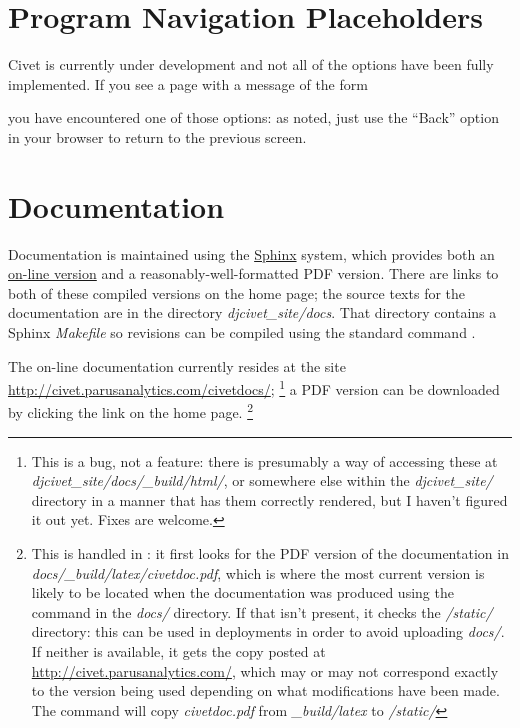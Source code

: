 \documentclass[letterpaper,10pt,english]{sphinxmanual}
\begin{document}
\section{Program Navigation Placeholders}
\label{intro:program-navigation-placeholders}
Civet is currently under development and not all of the options have
been fully implemented. If you see a page with a message of the form
\begin{quote}

\end{quote}

you have encountered one of those options: as noted, just use the “Back”
option in your browser to return to the previous screen.


\section{Documentation}
\label{intro:documentation}
Documentation is maintained using the \href{http://http://sphinx-doc.org/}{Sphinx} system, which provides both an
\href{http://civet.parusanalytics.com/civetdocs/index.html}{on-line version} and a reasonably-well-formatted PDF version. There
are links to both of these compiled versions on the home page; the  source texts for the documentation are in the
directory \emph{djcivet\_site/docs}. That directory contains a Sphinx \emph{Makefile} so revisions can be compiled using the standard
command .

The on-line documentation currently resides at the site \href{http://civet.parusanalytics.com/civetdocs/}{http://civet.parusanalytics.com/civetdocs/}; \footnote{
This is a bug, not a feature: there is presumably a way of accessing these at \emph{djcivet\_site/docs/\_build/html/}, or
somewhere else within the \emph{djcivet\_site/} directory
in a manner that has them correctly rendered, but I haven't figured it out yet. Fixes are welcome.
} a PDF version can
be downloaded by clicking the  link on the home page. \footnote{
This is handled in : it first looks for the PDF version of the documentation in
\emph{docs/\_build/latex/civetdoc.pdf}, which is where the most current version is likely to be located when the
documentation was produced using the  command in the \emph{docs/} directory. If that isn't present,
it checks the \emph{/static/} directory: this can be used in deployments in order to avoid uploading  \emph{docs/}. If neither
is available, it gets the copy posted at \href{http://civet.parusanalytics.com/}{http://civet.parusanalytics.com/}, which may or may not correspond exactly to the
version being used depending on what modifications have been made. The command  will copy \emph{civetdoc.pdf} from
\emph{\_build/latex} to \emph{/static/}
}
\end{document}
